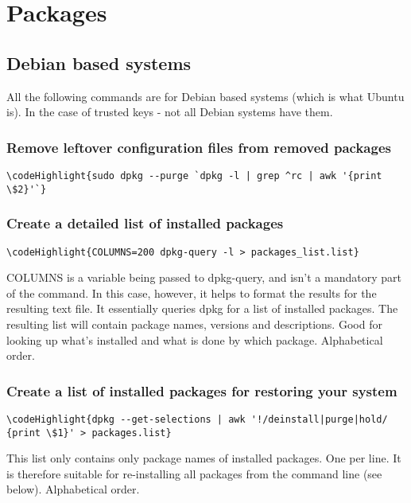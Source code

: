\documentclass[12pt,a4paper]{article}
\begin{document}
\section{Packages}
\label{Packages}
\subsection{Debian based systems}
All the following commands are for Debian based systems (which is what Ubuntu is).  In the case of trusted keys - not all Debian systems have them. 
\subsubsection{Remove leftover configuration files from removed packages}
\begin{Verbatim}[commandchars=\\\{\}]
\codeHighlight{sudo dpkg --purge `dpkg -l | grep ^rc | awk '{print \$2}'`}
\end{Verbatim}


\subsubsection{Create a detailed list of installed packages}
\begin{Verbatim}[commandchars=\\\{\}]
\codeHighlight{COLUMNS=200 dpkg-query -l > packages_list.list}
\end{Verbatim}
COLUMNS is a variable being passed to dpkg-query, and isn't a mandatory part of the command.  In this case, however, it helps to format the results for the resulting text file.  It essentially queries dpkg for a list of installed packages.  The resulting list will contain package names, versions and descriptions. Good for looking up what’s installed and what is done by which package. Alphabetical order.

\subsubsection{Create a list of installed packages for restoring your system}
\begin{Verbatim}[commandchars=\\\{\}]
\codeHighlight{dpkg --get-selections | awk '!/deinstall|purge|hold/ {print \$1}' > packages.list}
\end{Verbatim}
This list only contains only package names of installed packages. One per line. It is therefore suitable for re-installing all packages from the command line (see below). Alphabetical order.
\end{document}
